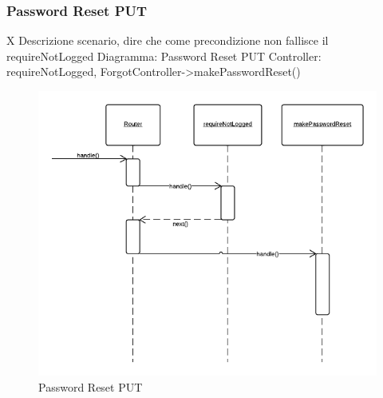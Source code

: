 \subsubsection{Password Reset PUT} X
Descrizione scenario, dire che come precondizione non fallisce il requireNotLogged
Diagramma: Password Reset PUT
Controller: requireNotLogged, ForgotController->makePasswordReset()
\begin{figure}[H]
	\begin{center} 
		\includegraphics[scale=0.60]{scenari/Password Reset PUT.png} 
		\caption{Password Reset PUT}
	\end{center} 
\end{figure}

